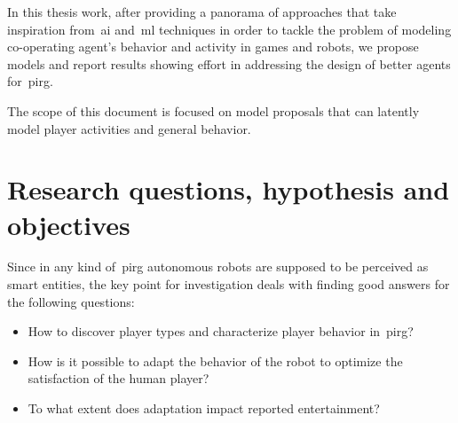 In this thesis work, after providing a panorama of approaches that take inspiration from~\gls{ai} and~\gls{ml} techniques in order to tackle the problem of modeling co-operating agent's behavior and activity in games and robots, we propose models and report results showing effort in addressing the design of better %
agents for~\gls{pirg}.%

The scope of this document is  focused on model proposals that can latently model player activities and general behavior. %

\section{Research questions, hypothesis and objectives}\label{sec:research_question}
Since in any kind of~\gls{pirg} autonomous robots are supposed to be perceived as smart entities, the key point for investigation deals with finding good answers for the following questions:

\begin{itemize}
\item How to discover player types and characterize player behavior in~\gls{pirg}? %
\item How is it possible to adapt the behavior of the robot to optimize the satisfaction of the human player?
\item To what extent does adaptation impact reported entertainment? %
\end{itemize}

